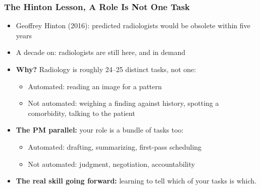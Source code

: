 \begin{frame}[fragile]\frametitle{The Hinton Lesson, A Role Is Not One Task}

\begin{itemize}
  \item Geoffrey Hinton (2016): predicted radiologists would be obsolete within five years
  \item A decade on: radiologists are still here, and in demand
  \item \textbf{Why?} Radiology is roughly 24--25 distinct tasks, not one:
    \begin{itemize}
      \item Automated: reading an image for a pattern
      \item Not automated: weighing a finding against history, spotting a comorbidity, talking to the patient
    \end{itemize}
  \item \textbf{The PM parallel:} your role is a bundle of tasks too:
    \begin{itemize}
      \item Automated: drafting, summarizing, first-pass scheduling
      \item Not automated: judgment, negotiation, accountability
    \end{itemize}
  \item \textbf{The real skill going forward:} learning to tell which of your tasks is which.
\end{itemize}

\end{frame}

